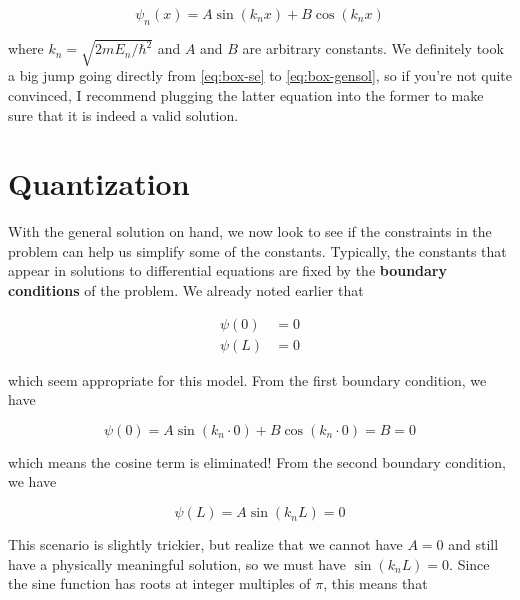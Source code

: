 \begin{tcolorbox}[title=General solution to particle in a box] \vspace{-2ex}
	\begin{equation}
		\psi_n(x) = A\sin(k_nx) + B\cos(k_nx) \label{eq:box-gensol}
	\end{equation}
\end{tcolorbox}

\noindent where $k_n = \sqrt{2mE_n/\hbar^2}$ and $A$ and $B$ are arbitrary constants. 
We definitely took a big jump going directly from \autoref{eq:box-se} to \autoref{eq:box-gensol}, so if you're not quite convinced, I recommend plugging the latter equation into the former to make sure that it is indeed a valid solution.


\section{Quantization}

With the general solution on hand, we now look to see if the constraints in the problem can help us simplify some of the constants. 
Typically, the constants that appear in solutions to differential equations are fixed by the \textbf{boundary conditions} of the problem. 
We already noted earlier that

\begin{align}
	\psi(0) &= 0 \\
	\psi(L) &= 0
\end{align}

\noindent which seem appropriate for this model. 
From the first boundary condition, we have

\begin{equation*}
	\psi(0) = A\sin(k_n \cdot 0) + B\cos(k_n \cdot 0) = B = 0
\end{equation*}

\noindent which means the cosine term is eliminated! 
From the second boundary condition, we have

\begin{equation*}
	\psi(L) = A\sin(k_nL) = 0
\end{equation*}

This scenario is slightly trickier, but realize that we cannot have $A = 0$ and still have a physically meaningful solution, so we must have $\sin(k_nL) = 0$. 
Since the sine function has roots at integer multiples of $\pi$, this means that

